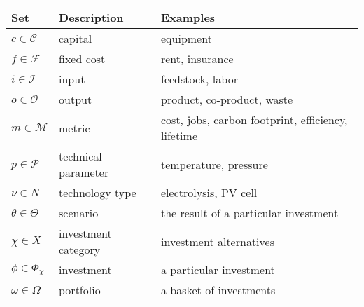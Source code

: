 \documentclass[letterpaper,10pt,english]{sphinxmanual}
\begin{document}
\begin{savenotes}\sphinxattablestart
\centering
{}
\sphinxthecaptionisattop
{}\label{\detokenize{formulation:table-1}}\label{\detokenize{formulation:tbl-sets}}
\sphinxaftertopcaption
\begin{tabulary}{\linewidth}[t]{|T|T|T|}
\hline
\sphinxstyletheadfamily 
Set
&\sphinxstyletheadfamily 
Description
&\sphinxstyletheadfamily 
Examples
\\
\hline
\(c \in \mathcal{C}\)
&
capital
&
equipment
\\
\hline
\(f \in \mathcal{F}\)
&
fixed cost
&
rent, insurance
\\
\hline
\(i \in \mathcal{I}\)
&
input
&
feedstock, labor
\\
\hline
\(o \in \mathcal{O}\)
&
output
&
product, co-product, waste
\\
\hline
\(m \in \mathcal{M}\)
&
metric
&
cost, jobs, carbon footprint, efficiency, lifetime
\\
\hline
\(p \in \mathcal{P}\)
&
technical parameter
&
temperature, pressure
\\
\hline
\(\nu \in N\)
&
technology type
&
electrolysis, PV cell
\\
\hline
\(\theta \in \Theta\)
&
scenario
&
the result of a particular investment
\\
\hline
\(\chi \in X\)
&
investment category
&
investment alternatives
\\
\hline
\(\phi \in \Phi_\chi\)
&
investment
&
a particular investment
\\
\hline
\(\omega \in \Omega\)
&
portfolio
&
a basket of investments
\\
\hline
\end{tabulary}
\par
\sphinxattableend\end{savenotes}
\end{document}
